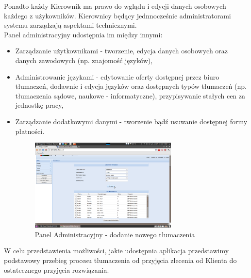 \documentclass[licencjacka]{pracamgr}
\begin{document}
Ponadto każdy Kierownik ma prawo do wglądu i edycji danych osobowych każdego z użykowników. 
Kierownicy będący jednnocześnie administratorami systemu zarządzają aspektami technicznymi.\\
Panel administracyjny udostępnia im między innymi:
\begin{itemize}
\item Zarządzanie użytkownikami - tworzenie, edycja danych osobowych oraz danych zawodowych (np. znajomość języków),
\item  Administrowanie językami - edytowanie oferty dostępnej przez biuro tłumaczeń, dodawnie i edycja języków oraz dostępnych typów tłumaczeń (np. tłumaczenia sądowe, naukowe - informatyczne), przypisywanie stałych cen za jednostkę pracy,
\item  Zarządzanie dodatkowymi danymi - tworzenie bądź usuwanie dostępnej formy płatności.
\begin{figure}[h!]
\centering
\includegraphics[width=0.7\textwidth]{resources/panel_administracyjny.png}
\caption{Panel Administracyjny - dodanie nowego tłumaczenia}
\end{figure}
\end{itemize}
W celu przedstawienia możliwości, jakie udostępnia aplikacja przedstawimy podstawowy przebieg procesu tłumaczenia od przyjęcia zlecenia od Klienta do ostatecznego przyjęcia rozwiązania.\\
\end{document}
